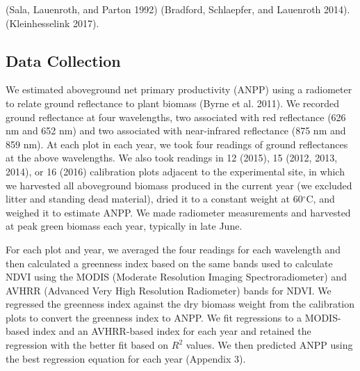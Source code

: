 \documentclass[fleqn,10pt,lineno]{wlpeerj} %
\begin{document}
(Sala, Lauenroth, and Parton 1992)
(Bradford, Schlaepfer, and Lauenroth 2014).
(Kleinhesselink 2017).

\hypertarget{data-collection}{%
\subsection{Data Collection}\label{data-collection}}

We estimated aboveground net primary productivity (ANPP) using a
radiometer to relate ground reflectance to plant biomass (Byrne et al.
2011). We recorded ground reflectance at four wavelengths, two
associated with red reflectance (626 nm and 652 nm) and two associated
with near-infrared reflectance (875 nm and 859 nm). At each plot in each
year, we took four readings of ground reflectances at the above
wavelengths. We also took readings in 12 (2015), 15 (2012, 2013, 2014),
or 16 (2016) calibration plots adjacent to the experimental site, in
which we harvested all aboveground biomass produced in the current year
(we excluded litter and standing dead material), dried it to a constant
weight at 60\(^{\circ}\)C, and weighed it to estimate ANPP. We made
radiometer measurements and harvested at peak green biomass each year,
typically in late June.

For each plot and year, we averaged the four readings for each
wavelength and then calculated a greenness index based on the same bands
used to calculate NDVI using the MODIS (Moderate Resolution Imaging
Spectroradiometer) and AVHRR (Advanced Very High Resolution Radiometer)
bands for NDVI. We regressed the greenness index against the dry biomass
weight from the calibration plots to convert the greenness index to
ANPP. We fit regressions to a MODIS-based index and an AVHRR-based index
for each year and retained the regression with the better fit based on
\(R^2\) values. We then predicted ANPP using the best regression
equation for each year (Appendix 3).
\end{document}
